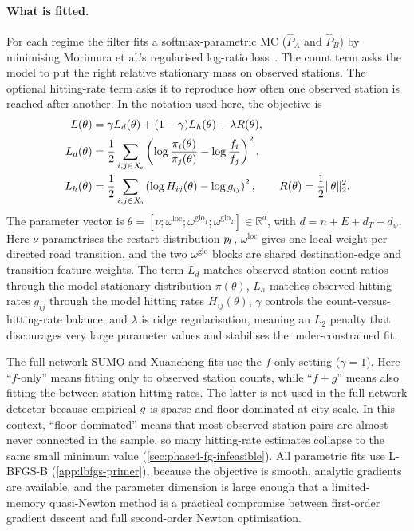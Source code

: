 \paragraph{What is fitted.}
For each regime the filter fits a softmax-parametric MC
($\hat{P}_A$ and $\hat{P}_B$) by minimising Morimura et al.'s regularised
log-ratio loss~\cite{morimura2013}. The count term asks the model to put
the right relative stationary mass on observed stations. The optional
hitting-rate term asks it to reproduce how often one observed station is
reached after another. In the notation used here, the objective is
\begin{equation}
\begin{aligned}
L(\theta) &= \gamma L_d(\theta) + (1-\gamma)L_h(\theta)
          + \lambda R(\theta), \\
L_d(\theta) &= \frac{1}{2}\sum_{i,j\in X_{\!o}}
\left(\log\frac{\pi_i(\theta)}{\pi_j(\theta)}
-\log\frac{f_i}{f_j}\right)^2, \\
L_h(\theta) &= \frac{1}{2}\sum_{i,j\in X_{\!o}}
\left(\log H_{ij}(\theta)-\log g_{ij}\right)^2,
\qquad
R(\theta)=\frac{1}{2}\|\theta\|_2^2 .
\end{aligned}
\label{eq:morimura-loss}
\end{equation}
The parameter vector is
$\theta=[\nu;\omega^{\mathrm{loc}};\omega^{\mathrm{glo}_1};
\omega^{\mathrm{glo}_2}] \in \mathbb{R}^d$, with
$d=n+E+d_T+d_\psi$. Here $\nu$ parametrises the restart distribution
$p_{\!I}$, $\omega^{\mathrm{loc}}$ gives one local weight per directed road
transition, and the two $\omega^{\mathrm{glo}}$ blocks are shared
destination-edge and transition-feature weights. The term $L_d$ matches
observed station-count ratios through the model stationary distribution
$\pi(\theta)$, $L_h$ matches observed hitting rates $g_{ij}$ through the
model hitting rates $H_{ij}(\theta)$, $\gamma$ controls the
count-versus-hitting-rate balance, and $\lambda$ is ridge
regularisation, meaning an $L_2$ penalty that discourages very large
parameter values and stabilises the under-constrained fit.

The full-network SUMO and Xuancheng fits use the $f$-only setting
($\gamma=1$). Here ``$f$-only'' means fitting only to observed station
counts, while ``$f+g$'' means also fitting the between-station hitting
rates. The latter is not used in the full-network detector because
empirical $g$ is sparse and floor-dominated at city scale. In this
context, ``floor-dominated'' means that most observed station pairs are
almost never connected in the sample, so many hitting-rate estimates
collapse to the same small minimum value
(\cref{sec:phase4-fg-infeasible}). All parametric fits use L-BFGS-B
(\cref{app:lbfgs-primer}), because the objective is smooth, analytic
gradients are available, and the parameter dimension is large enough that
a limited-memory quasi-Newton method is a practical compromise between
first-order gradient descent and full second-order Newton optimisation.


